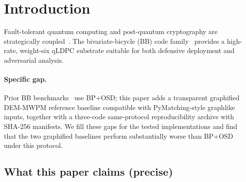 \documentclass[11pt,a4paper]{article}
\begin{document}
\section{Introduction}

Fault-tolerant quantum computing and post-quantum cryptography are
strategically coupled~\cite{Shor1997,NISTFIPS203,NISTFIPS204,NISTFIPS205}.
The bivariate-bicycle (BB) code family~\cite{Bravyi2024} provides a
high-rate, weight-six qLDPC substrate suitable for both defensive
deployment and adversarial analysis.

\paragraph{Specific gap.}
Prior BB benchmarks~\cite{Bravyi2024,ShawRengaswamy2026} use BP+OSD;
this paper adds a transparent graphified DEM-MWPM reference baseline compatible with PyMatching-style graphlike inputs, together with a three-code same-protocol reproducibility archive with SHA-256 manifests.
We fill these gaps for the tested implementations and find that the two graphified baselines perform substantially worse than BP+OSD under this protocol.

\subsection{What this paper claims (precise)}
\end{document}
